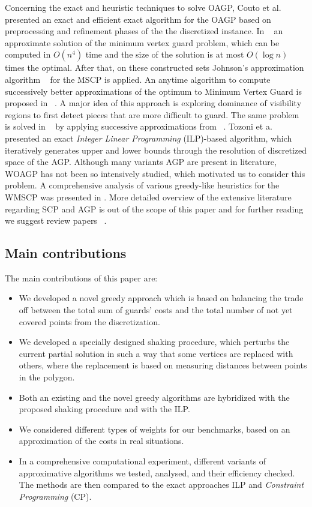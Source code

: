 \documentclass[runningheads,a4paper]{elsarticle}
\begin{document}
	Concerning the exact and heuristic techniques to solve OAGP, Couto et al.~\cite{couto2007exact} presented an exact and efficient exact algorithm for the OAGP based on preprocessing and refinement phases of the the discretized instance. In ~\cite{ghosh2010approximation} an approximate solution of the minimum vertex guard problem, which can be computed in $O(n^4)$ time and the size of the solution is at most $O(\log n)$ times the optimal. After that, on these constructed sets Johnson’s approximation algorithm ~\cite{johnson1974approximation} for the MSCP is applied. An anytime algorithm to compute successively better approximations of the optimum to Minimum Vertex Guard is proposed in ~\cite{tomas2003approximation}.  A major idea of this approach is exploring dominance of visibility regions to first detect pieces that are
	more difficult to guard. The same problem is solved   in ~\cite{tomas2006visibility} by applying successive approximations from  ~\cite{tomas2003approximation}.
	Tozoni et a. ~\cite{tozoni2013practical,tozoni2016algorithm}  presented an exact \emph{Integer Linear Programming}  (ILP)-based  algorithm, which iteratively generates upper and lower bounds through the resolution of discretized space of the AGP. Although many variants AGP are present in literature, WOAGP has not been so intensively studied, which motivated us to consider this problem.
	A comprehensive analysis of various greedy-like heuristics for the WMSCP was presented in \cite{vasko2016best}.
	More detailed overview of the extensive literature regarding SCP and AGP is out of the scope of this paper and for further reading we suggest review papers ~\cite{caprara2000algorithms,ren2010new,ghosh2010approximation2}. 

	
	\subsection{Main contributions}
	The main contributions of this paper are:
	\begin{itemize}
		\item We developed a novel greedy approach which is based on balancing the trade off between the total sum of guards' costs and the total number of not yet covered points from the discretization.
		\item We developed a specially designed shaking procedure, which perturbs the current partial solution in such a way that some vertices are replaced with others, where the replacement is based on measuring  distances between points in the polygon.
		\item Both an existing and the novel greedy algorithms are hybridized with the proposed shaking procedure and with the ILP.
		\item We considered different types of weights for our benchmarks, based on an approximation of the costs in real situations.
		\item In a comprehensive computational experiment,  different variants of approximative algorithms we tested, analysed, and their efficiency checked. The methods are then compared to the exact approaches ILP and \emph{Constraint Programming} (CP).
	\end{itemize}
\end{document}

